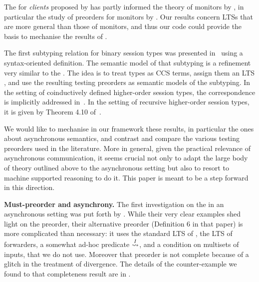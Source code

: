The \mustpreorder for {\em clients} proposed by
\cite{DBLP:journals/corr/BernardiH15} has partly informed the
theory of monitors by \cite{DBLP:journals/pacmpl/AcetoAFIL19},
in particular the study of preorders for monitors by
\cite{DBLP:journals/iandc/Francalanza21}.
Our results concern LTSs that are more general than those of monitors,
and thus %
our code could provide the basis to mechanise
the results of \cite{DBLP:journals/pacmpl/AcetoAFIL19}.

The first subtyping relation for binary session types was presented
in~\cite{DBLP:journals/acta/GayH05} using a syntax-oriented definition.
The semantic model of that subtyping is a refinement %
very similar to the \mustpreorder. The idea is to treat types as \textsc{CCS} terms,
assign them an LTS
\cite{DBLP:conf/ppdp/CastagnaDGP09,DBLP:conf/ppdp/Barbanerad10,DBLP:journals/iandc/RavaraRV12,DBLP:journals/mscs/BernardiH16},
and use the resulting testing preorders as semantic models of the
subtyping.
In the setting of coinductively defined higher-order session types, the
correspondence is implicitly addressed
in~\cite{DBLP:conf/ppdp/CastagnaDGP09}.
In the setting of recursive higher-order session types, %
it is given by Theorem 4.10 of~\cite{DBLP:journals/corr/BernardiH13}.

We would like to mechanise in our framework these results,
in particular the ones about asynchronous semantics, and contrast and
compare the various testing preorders used in the literature.
More in general, given the practical relevance of asynchronous
communication, it seems crucial %
not only to adapt the large body of theory
outlined above to the asynchronous setting but also to resort to
machine supported reasoning to do it. This paper is meant to be a step
forward in this direction.


{\bfseries Must-preorder and asynchrony.}
The first investigation on the \mustpreorder in an asynchronous
setting was put forth by \cite{DBLP:conf/fsttcs/CastellaniH98}.
While their very clear examples shed light on the preorder, their
alternative preorder (Definition 6 in that paper) is more complicated
than necessary: it uses the standard LTS of \ACCS, the LTS of
forwarders, a somewhat ad-hoc predicate $\stackrel{I}{\rightsquigarrow}$, and a condition on
multisets of inputs, that we do not use. Moreover that preorder is not
complete because of a glitch in the treatment of divergence.
The details of the counter-example we found to that completeness
result are in .

